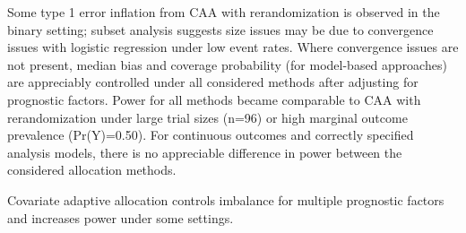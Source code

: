 {Some type 1 error inflation from CAA with rerandomization is observed in the binary setting; subset analysis suggests size issues may be due to convergence issues with logistic regression under low event rates. 
Where convergence issues are not present, median bias and coverage probability (for model-based approaches) are appreciably controlled under all considered methods after adjusting for prognostic factors.
Power for all methods became comparable to CAA with rerandomization under large trial sizes (n=96) or high marginal outcome prevalence (Pr(Y)=0.50).
For continuous outcomes and correctly specified analysis models, there is no appreciable difference in power between the considered allocation methods.

Covariate adaptive allocation controls imbalance for multiple prognostic factors and increases power under some settings.
}



\newcommand{\earlylumi}{\SI{1.09}{\fbinv}}


\captionnamefont{\sffamily}
\tightlists %